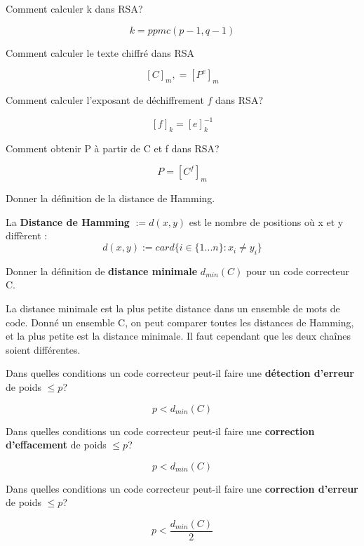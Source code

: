 \documentclass[12pt]{article}
\newcommand*{\xfield}[1]{\begin{mdframed}\centering #1\end{mdframed}\bigskip}
\newenvironment{note}{}{}
\begin{document}
\begin{note}
\xfield{Comment calculer k dans RSA?}
\xfield{$$k = ppmc(p-1,q-1)$$}
\end{note}

\begin{note}
\xfield{Comment calculer le texte chiffré dans RSA}
\xfield{$$[C]_m, = [P^{e}]_m$$}
\end{note}

\begin{note}
\xfield{Comment calculer l'exposant de déchiffrement $f$ dans RSA?}
\xfield{$$[f]_k = [e]_{k}^{-1}$$}
\end{note}

\begin{note}
\xfield{Comment obtenir P à partir de C et f dans RSA?}
\xfield{$$P = [C^f]_m$$}
\end{note}

\begin{note}
\xfield{Donner la définition de la distance de Hamming.}
\xfield{La \textbf{Distance de Hamming} $:= d(x,y)$ est le nombre de positions où x et y diffèrent : \
$$d(x,y) := card\{i \in \{1...n\} : x_i \neq y_i\}$$
}
\end{note}

\begin{note}
\xfield{Donner la définition de \textbf{distance minimale} $d_{min}(C)$ pour un code correcteur C.}
\xfield{La distance minimale est la plus petite distance dans un ensemble de mots de code. Donné un ensemble C, on peut comparer toutes les distances de Hamming, et la plus petite est la distance minimale. Il faut cependant que les deux chaînes soient différentes.}
\end{note}

\begin{note}
\xfield{Dans quelles conditions un code correcteur peut-il faire une \textbf{détection d'erreur} de poids $\leq p$?}
\xfield{$$p < d_{min}(C)$$}
\end{note}

\begin{note}
\xfield{Dans quelles conditions un code correcteur peut-il faire une \textbf{correction d'effacement} de poids $\leq p$?}
\xfield{$$p < d_{min}(C)$$}
\end{note}

\begin{note}
\xfield{Dans quelles conditions un code correcteur peut-il faire une \textbf{correction d'erreur} de poids $\leq p$?}
\xfield{$$p < \frac{d_{min}(C)}{2}$$}
\end{note}
\end{document}
